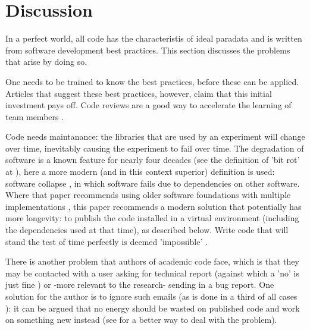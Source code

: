 \section{Discussion}

In a perfect world, all code has the characteristis of ideal paradata
and is written from software development best practices.
This section discusses the problems that arise by doing so.


One needs to be trained to know the best practices,
before these can be applied. 
Articles that suggest these best practices, however, claim that this initial
investment pays off.
Code reviews are a good way to accelerate the 
learning of team members \cite{vable2021code}.


Code needs maintanance:
the libraries that are used by an experiment
will change over time, inevitably causing the experiment to fail
over time. 
The degradation of software is a known feature for nearly 
four decades (see the definition of 'bit rot' at \cite{steele1983hacker}),
here a more modern (and in this context superior)
definition is used: software collapse \cite{hinsen2019dealing},
in which software fails due to dependencies on other 
software.
Where that paper recommends using older software foundations 
with multiple implementations \cite{hinsen2019dealing},
this paper recommends a modern solution that potentially has more 
longevity:
to publish the code installed in a virtual environment
(including the dependencies used at that time), as described below.
Write code that will stand the test of time perfectly
is deemed 'impossible' \cite{benureau2018re}.


There is another problem that authors of academic code face,
which is that they may be contacted with a user 
asking for technical report 
(against which a 'no' is just fine \cite{barnes2010publish})
or -more relevant to the research- sending in a bug report.
One solution for the author is to ignore such emails (as is done in a third
of all cases \cite{teunis2015corresponding}):
it can be argued that no energy should be wasted on published code
and work on something new instead 
(see \cite{barnes2010publish} for a better way to deal with the problem).



